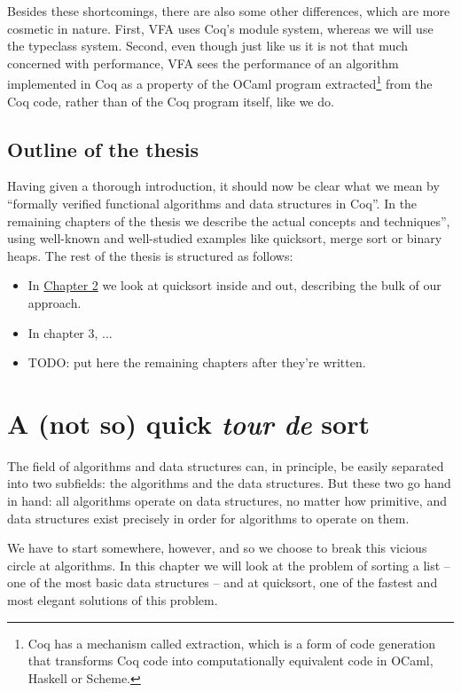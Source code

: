 \documentclass[declaration,mgr,english,shortabstract]{iithesis}
\begin{document}
Besides these shortcomings, there are also some other differences, which are more cosmetic in nature. First, VFA uses Coq's module system, whereas we will use the typeclass system. Second, even though just like us it is not that much concerned with performance, VFA sees the performance of an algorithm implemented in Coq as a property of the OCaml program extracted\footnote{Coq has a mechanism called extraction, which is a form of code generation that transforms Coq code into computationally equivalent code in OCaml, Haskell or Scheme.} from the Coq code, rather than of the Coq program itself, like we do.

\section{Outline of the thesis} \label{outline}

Having given a thorough introduction, it should now be clear what we mean by ``formally verified functional algorithms and data structures in Coq''. In the remaining chapters of the thesis we describe the actual concepts and techniques'', using well-known and well-studied examples like quicksort, merge sort or binary heaps. The rest of the thesis is structured as follows:

\begin{itemize}
    \item In \hyperref[quicksort]{Chapter 2} we look at quicksort inside and out, describing the bulk of our approach.
    \item In chapter 3, ...
    \item TODO: put here the remaining chapters after they're written.
\end{itemize}

\chapter{A (not so) quick \textit{tour de} sort} \label{quicksort}

The field of algorithms and data structures can, in principle, be easily separated into two subfields: the algorithms and the data structures. But these two go hand in hand: all algorithms operate on data structures, no matter how primitive, and data structures exist precisely in order for algorithms to operate on them.

We have to start somewhere, however, and so we choose to break this vicious circle at algorithms. In this chapter we will look at the problem of sorting a list -- one of the most basic data structures -- and at quicksort, one of the fastest and most elegant solutions of this problem.
\end{document}
